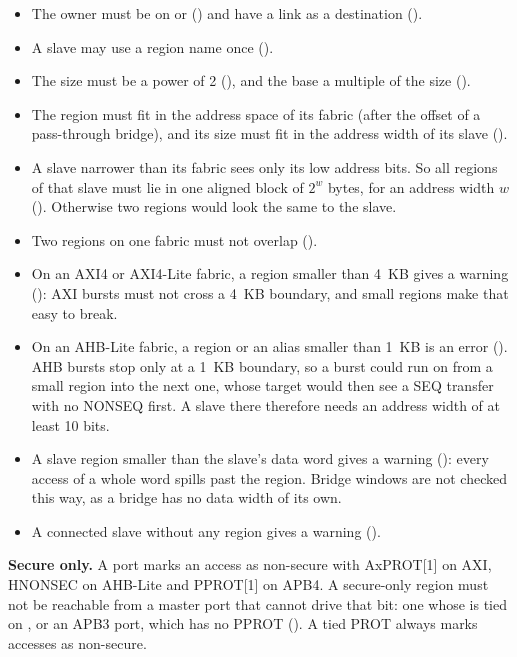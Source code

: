 \begin{itemize}
\item The owner must be on  or  ()
  and have a link as a destination ().
\item A slave may use a region name once ().
\item The size must be a power of 2 (), and the base a
  multiple of the size ().
\item The region must fit in the address space of its fabric (after the offset of a
  pass-through  bridge), and its size must fit in the address width of its
  slave ().
\item A slave narrower than its fabric sees only its low address bits. So all regions of
  that slave must lie in one aligned block of $2^w$ bytes, for an address width $w$
  (). Otherwise two regions would look the same to the slave.
\item Two regions on one fabric must not overlap ().
\item On an AXI4 or AXI4-Lite fabric, a region smaller than 4~KB gives a warning
  (): AXI bursts must not cross a 4~KB boundary, and small regions
  make that easy to break.
\item On an AHB-Lite fabric, a region or an alias smaller than 1~KB is an error
  (). AHB bursts stop only at a 1~KB boundary, so a burst could run on
  from a small region into the next one, whose target would then see a SEQ transfer with no
  NONSEQ first. A slave there therefore needs an address width of at least 10 bits.
\item A slave region smaller than the slave's data word gives a warning
  (): every access of a whole word spills past the region. Bridge
  windows are not checked this way, as a bridge has no data width of its own.
\item A connected slave without any region gives a warning ().
\end{itemize}

\textbf{Secure only.} A port marks an access as non-secure with AxPROT[1] on AXI, HNONSEC
on AHB-Lite and PPROT[1] on APB4. A secure-only region must not be reachable from a
master port that cannot drive that bit: one whose  is tied on
, or an APB3 port, which has no PPROT
(). A tied PROT always marks accesses as non-secure.

